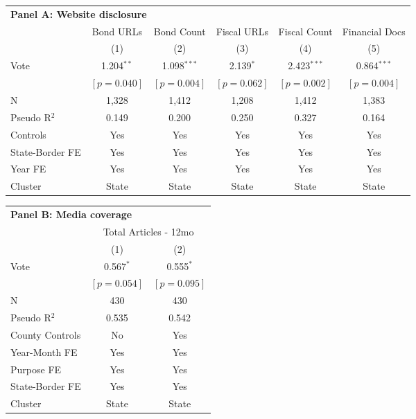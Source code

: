 \begingroup
\centering
\begin{tabular*}{\textwidth}{@{\extracolsep{\fill}}lccccc}
\multicolumn{6}{l}{\textbf{Panel A: Website disclosure}}\\

\addlinespace
   \toprule
 & Bond URLs & Bond Count & Fiscal URLs & Fiscal Count & Financial Docs\\
 & (1) & (2) & (3) & (4) & (5)\\
   \midrule 
Vote & 1.204$^{**}$ & 1.098$^{***}$ & 2.139$^{*}$ & 2.423$^{***}$ & 0.864$^{***}$\\
 & $[p=0.040]$ & $[p=0.004]$ & $[p=0.062]$ & $[p=0.002]$ & $[p=0.004]$\\
   \hline
N & 1,328 & 1,412 & 1,208 & 1,412 & 1,383\\
Pseudo R$^2$ & 0.149 & 0.200 & 0.250 & 0.327 & 0.164\\
Controls & Yes & Yes & Yes & Yes & Yes\\
State-Border FE & Yes & Yes & Yes & Yes & Yes\\
Year FE & Yes & Yes & Yes & Yes & Yes\\
Cluster & State & State & State & State & State\\
   \bottomrule
\end{tabular*}
\par\endgroup

\vspace{0.75em}

\begingroup
\centering
\begin{tabular*}{\textwidth}{@{\extracolsep{\fill}}lcc}
\multicolumn{3}{l}{\textbf{Panel B: Media coverage}}\\

\addlinespace
   \toprule
    & \multicolumn{2}{c}{Total Articles - 12mo}\\
   \cmidrule(lr){2-3}
 & (1) & (2)\\
   \midrule 
Vote & 0.567$^{*}$ & 0.555$^{*}$\\
 & $[p=0.054]$ & $[p=0.095]$\\
   \hline
N & 430 & 430\\
Pseudo R$^2$ & 0.535 & 0.542\\
County Controls & No & Yes\\
Year-Month FE & Yes & Yes\\
Purpose FE & Yes & Yes\\
State-Border FE & Yes & Yes\\
Cluster & State & State\\
   \bottomrule
\end{tabular*}
\par\endgroup

